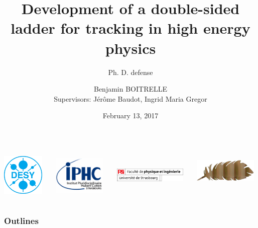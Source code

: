 \documentclass{beamer}
\title[Ph. D. defense]{Development of a double-sided ladder for tracking in high energy physics}
\subtitle{Ph. D. defense}
\institute{Strasbourg}
\author[Benjamin BOITRELLE]{Benjamin BOITRELLE  \\ \scriptsize{Supervisors: Jérôme Baudot, Ingrid Maria Gregor}} %
\date{February 13, 2017}
\begin{document}
  \begin{frame}[plain]
    \maketitle
    \begin{columns}[t]
        \begin{column}{2cm}
            \includegraphics[width = 2cm, height = 2cm]{Pictures/DESY-Logo.png}
        \end{column}

        \begin{column}{2.5cm}
            \includegraphics[width = 2.5cm, height = 2cm]{Pictures/logo_IPHC_10cm.png}
        \end{column}
        \begin{column}{3.5cm}
            \includegraphics[width = 3.5cm, height = 2cm]{Pictures/logo_P&i_Fac.png}
        \end{column}        
        \begin{column}{3cm}
            \includegraphics[width = 3cm, height = 1.5cm]{Pictures/logo_plume.png}
        \end{column}
    \end{columns}

  \end{frame}

  \begin{frame}[plain]
    \frametitle{Outlines}

    \tableofcontents[subsectionstyle=hide]
  \end{frame}
\end{document}

